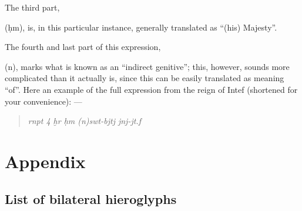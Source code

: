 \documentclass[a5paper,twoside,11pt]{report}
\newcommand{\xHiero}{ḫ}
\newcommand{\HHiero}{ḥ}
\begin{document}
			The third part, \begin{hieroglyph}{\leavevmode {}}\end{hieroglyph} (ḥm), is, in this particular instance, generally translated as “(his) Majesty”.

			The fourth and last part of this expression, \begin{hieroglyph}{\leavevmode {}}\end{hieroglyph} (n), marks what is known as an “indirect genitive”; this, however, sounds more complicated than it actually is, since this can be easily translated as meaning “of”.
			Here an example of the full expression from the reign of Intef (shortened for your convenience): —

			\begin{quote}
				\begin{hieroglyph}{\leavevmode {}\HinterSignsSpace
{}\HinterSignsSpace
{}\HinterSignsSpace
{}\HinterSignsSpace
{}\HinterSignsSpace
\HfullSpace \HinterSignsSpace
{}\HinterSignsSpace
{}\HinterSignsSpace
{}%
}\end{hieroglyph}
				\newline
				\textit{rnpt 4 \xHiero r \HHiero m (n)swt-bjtj jnj-jt.f}
			\end{quote}





	\part*{Appendix}
  \chapter*{List of bilateral hieroglyphs}
    \label{bitri}
\end{document}
